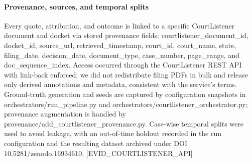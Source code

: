 \paragraph{Provenance, sources, and temporal splits}\label{provenance-sources-and-temporal-splits}

Every quote, attribution, and outcome is linked to a specific CourtListener document and docket via stored provenance fields: courtlistener\_document\_id, docket\_id, source\_url, retrieved\_timestamp, court\_id, court\_name, state, filing\_date, decision\_date, document\_type, case\_number, page\_range, and doc\_sequence\_index. Access occurred through the CourtListener REST API with link-back enforced; we did not redistribute filing PDFs in bulk and release only derived annotations and metadata, consistent with the service's terms. Ground-truth generation and seeds are captured by configuration snapshots in orchestrators/run\_pipeline.py and orchestrators/courtlistener\_orchestrator.py; provenance augmentation is handled by provenance/add\_courtlistener\_provenance.py. Case-wise temporal splits were used to avoid leakage, with an out-of-time holdout recorded in the run configuration and the resulting dataset archived under DOI 10.5281/zenodo.16934610. {[}EVID\_COURTLISTENER\_API{]}
